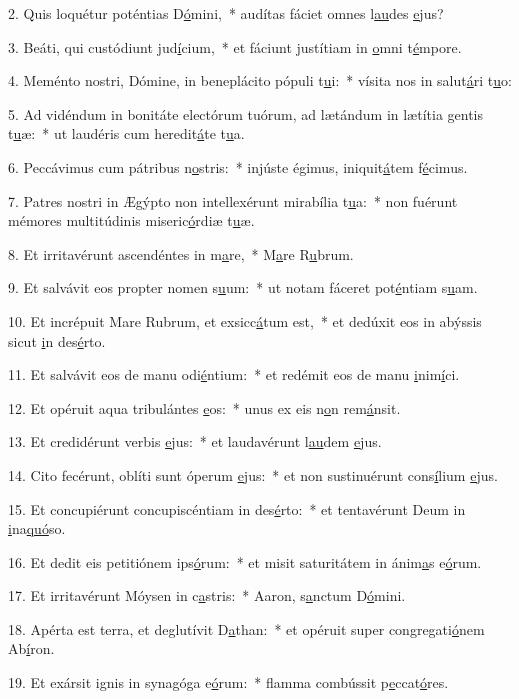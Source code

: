 2. Quis loquétur poténtias D\uline{ó}mini,~* audítas fáciet omnes l\uline{au}des \uline{e}jus?\par 
3. Beáti, qui custódiunt jud\uline{í}cium,~* et fáciunt justítiam in \uline{o}mni t\uline{é}mpore.\par 
4. Meménto nostri, Dómine, in beneplácito pópuli t\uline{u}i:~* vísita nos in salut\uline{á}ri t\uline{u}o:\par 
5. Ad vidéndum in bonitáte electórum tuórum, ad lætándum in lætítia gentis t\uline{u}æ:~* ut laudéris cum heredit\uline{á}te t\uline{u}a.\par 
6. Peccávimus cum pátribus n\uline{o}stris:~* injúste égimus, iniquit\uline{á}tem f\uline{é}cimus.\par 
7. Patres nostri in Ægýpto non intellexérunt mirabília t\uline{u}a:~* non fuérunt mémores multitúdinis miseric\uline{ó}rdiæ t\uline{u}æ.\par 
8. Et irritavérunt ascendéntes in m\uline{a}re,~* M\uline{a}re R\uline{u}brum.\par 
9. Et salvávit eos propter nomen s\uline{u}um:~* ut notam fáceret pot\uline{é}ntiam s\uline{u}am.\par 
10. Et incrépuit Mare Rubrum, et exsicc\uline{á}tum est,~* et dedúxit eos in abýssis sicut \uline{i}n des\uline{é}rto.\par 
11. Et salvávit eos de manu odi\uline{é}ntium:~* et redémit eos de manu \uline{i}nim\uline{í}ci.\par 
12. Et opéruit aqua tribulántes \uline{e}os:~* unus ex eis n\uline{o}n rem\uline{á}nsit.\par 
13. Et credidérunt verbis \uline{e}jus:~* et laudavérunt l\uline{au}dem \uline{e}jus.\par 
14. Cito fecérunt, oblíti sunt óperum \uline{e}jus:~* et non sustinuérunt cons\uline{í}lium \uline{e}jus.\par 
15. Et concupiérunt concupiscéntiam in des\uline{é}rto:~* et tentavérunt Deum in \uline{i}na\uline{quó}so.\par 
16. Et dedit eis petitiónem ips\uline{ó}rum:~* et misit saturitátem in ánim\uline{a}s e\uline{ó}rum.\par 
17. Et irritavérunt Móysen in c\uline{a}stris:~* Aaron, s\uline{a}nctum D\uline{ó}mini.\par 
18. Apérta est terra, et deglutívit D\uline{a}than:~* et opéruit super congregati\uline{ó}nem Ab\uline{í}ron.\par 
19. Et exársit ignis in synagóga e\uline{ó}rum:~* flamma combússit p\uline{e}ccat\uline{ó}res.\par 
